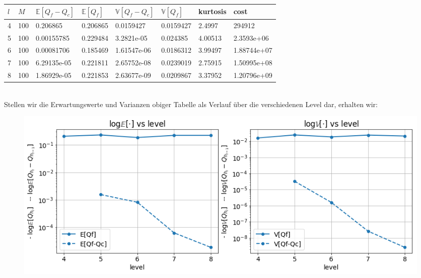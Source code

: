 \newlength\q
\setlength{}
\noindent\begin{tabular}{|p{0.15\q}|p{0.55\q}|p{1.4\q}|p{1.05\q}|p{1.35\q}|p{1.25\q}|p{0.9\q}|p{1.35\q}|}
	\hline
	$ l $   &  $ M $  &  $ \mathbb{E}[Q_f-Q_c] $  &   $ \mathbb{E}[Q_f] $ &  $ \mathbb{V}[Q_f-Q_c] $   &   $ \mathbb{V}[Q_f] $ &  kurtosis    &    cost\\
	\hline
	4 &  100&    0.206865 &   0.206865&   0.0159427 &  0.0159427 &     2.4997&      294912 \\
	5 &  100&  0.00155785 &   0.229484&  3.2821e-05 &   0.024385 &    4.00513&  2.3593e+06 \\
	6 &  100&  0.00081706 &   0.185469& 1.61547e-06 &  0.0186312 &    3.99497& 1.88744e+07 \\
	7 &  100& 6.29135e-05 &   0.221811& 2.65752e-08 &  0.0239019 &    2.75915& 1.50995e+08 \\
	8 &  100& 1.86929e-05 &   0.221853& 2.63677e-09 &  0.0209867 &    3.37952& 1.20796e+09 \\
	\hline 
\end{tabular}\\

Stellen wir die Erwartungswerte und Varianzen obiger Tabelle als Verlauf über die verschiedenen Level dar, erhalten wir:

\begin{figure}[H]
	\centering
	\includegraphics[width=\textwidth]{plots/mlmckonv.png} 
\end{figure}

